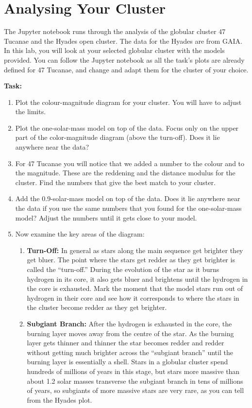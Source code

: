\documentclass{article}
\begin{document}
\section{Analysing Your Cluster}

The Jupyter notebook runs through the analysis of the globular cluster 47 Tucanae and the Hyades open cluster.  The data for the Hyades are from GAIA.  In this lab, you will look at your selected globular cluster with the models provided. You can follow the Jupyter notebook as all the task's plots are already defined for 47 Tucanae, and change and adapt them for the cluster of your choice.

\textbf{Task:}
\begin{enumerate}
 \setlength\itemsep{0em}
\item Plot the colour-magnitude diagram for your cluster.  You will have to adjust the limits.
\item Plot the one-solar-mass model on top of the data.  Focus only on the upper part of the color-magnitude diagram (above the turn-off). Does it lie anywhere near the data?
\item For 47 Tucanae you will notice that we added a number to the colour and to the magnitude. These are the reddening and the distance modulus for the cluster. Find the numbers that give the best match to your cluster.
\item Add the 0.9-solar-mass model on top of the data.  Does it lie anywhere near the data if you use the same numbers that you found for the one-solar-mass model?  Adjust the numbers until it gets close to your model.
\item Now examine the key areas of the diagram:
\begin{enumerate}
 \setlength\itemsep{0em}
    \item \textbf{Turn-Off:}
    In general as stars along the main sequence get brighter they get bluer.  The point where the stars get redder as they get brighter is called the ``turn-off.''  During the evolution of the star as it burns hydrogen in its core, it also gets bluer and brightens until the hydrogen in the core is exhausted.  Mark the moment that the model stars run out of hydrogen in their core and see how it corresponds to where the stars in the cluster become redder as they get brighter.
    \item \textbf{Subgiant Branch:}
    After the hydrogen is exhausted in the core, the burning layer moves away from the centre of the star.  As the burning layer gets thinner and thinner the star becomes redder and redder without getting much brighter across the ``subgiant branch'' until the burning layer is essentially a shell. Stars in a globular cluster spend hundreds of millions of years in this stage, but stars more massive than about 1.2 solar masses transverse the subgiant branch in tens of millions of years, so subgiants of more massive stars are very rare, as you can tell from the Hyades plot.

\end{enumerate}
\end{enumerate}
\end{document}
